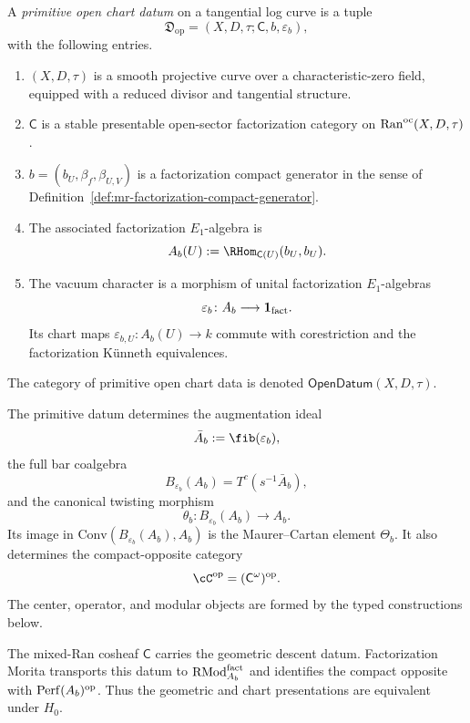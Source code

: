 \begin{definition}
\label{def:mr-open-datum}
A \emph{primitive open chart datum} on a tangential log curve is a
tuple
\[
 \mathfrak D_{\mathrm{op}}
 =
 (X,D,\tau;\mathsf C,b,\varepsilon_b),
\]
with the following entries.
\begin{enumerate}[label=\textup{(\roman*)}]
\item $(X,D,\tau)$ is a smooth projective curve over a
characteristic-zero field, equipped with a reduced divisor and
tangential structure.
\item $\mathsf C$ is a stable presentable open-sector factorization
category on $\mathrm{Ran}^{\mathrm{oc}}(X,D,\tau)$.
\item $b=(b_U,\beta_f,\beta_{U,V})$ is a factorization compact
generator in the sense of
Definition~\ref{def:mr-factorization-compact-generator}.
\item The associated factorization $E_1$-algebra is
\[
 A_b(U):=\RHom_{\mathsf C(U)}(b_U,b_U).
\]
\item The vacuum character is a morphism of unital factorization
$E_1$-algebras
\[
 \varepsilon_b\colon A_b\longrightarrow\mathbf1_{\mathrm{fact}}.
\]
Its chart maps $\varepsilon_{b,U}\colon A_b(U)\to k$ commute with
corestriction and the factorization K\"unneth equivalences.
\end{enumerate}
The category of primitive open chart data is denoted
$\mathsf{OpenDatum}(X,D,\tau)$.
\end{definition}

\begin{definition}
\label{def:mr-constructed-outputs}
The primitive datum determines the augmentation ideal
\[
 \bar A_b:=\fib(\varepsilon_b),
\]
the full bar coalgebra
\[
 B_{\varepsilon_b}(A_b)
 =T^c(s^{-1}\bar A_b),
\]
and the canonical twisting morphism
\[
 \theta_b\colon B_{\varepsilon_b}(A_b)\longrightarrow A_b.
\]
Its image in
$\mathrm{Conv}(B_{\varepsilon_b}(A_b),A_b)$ is the
Maurer--Cartan element $\Theta_b$.  It also determines the
compact-opposite category
\[
 \cC^\op=(\mathsf C^\omega)^\op.
\]
The center, operator, and modular objects are formed by the typed
constructions below.
\end{definition}

\begin{remark}
\label{rem:mr-primitive-chart-circularity}
The mixed-Ran cosheaf $\mathsf C$ carries the geometric descent datum.
Factorization Morita transports this datum to
$\mathrm{RMod}_{A_b}^{\mathrm{fact}}$ and identifies the compact opposite with
$\mathrm{Perf}(A_b)^{\mathrm{op}}$.  Thus the geometric and chart presentations
are equivalent under $H_0$.
\end{remark}

